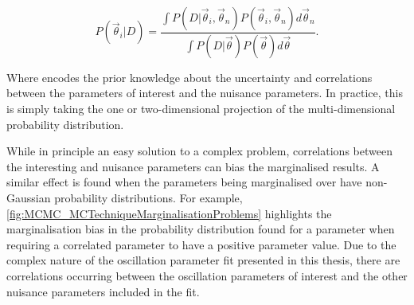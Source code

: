 \begin{equation}
P(\vec{\theta}_{i}|D) = \frac{\int P(D|\vec{\theta}_{i},\vec{\theta}_{n}) P(\vec{\theta}_{i},\vec{\theta}_{n}) d\vec{\theta}_{n}}{\int P(D|\vec{\theta}) P(\vec{\theta}) d\vec{\theta}}.
\end{equation}

Where  encodes the prior knowledge about the uncertainty and correlations between the parameters of interest and the nuisance parameters. In practice, this is simply taking the one or two-dimensional projection of the multi-dimensional probability distribution.

While in principle an easy solution to a complex problem, correlations between the interesting and nuisance parameters can bias the marginalised results. A similar effect is found when the parameters being marginalised over have non-Gaussian probability distributions. For example, \autoref{fig:MCMC_MCTechniqueMarginalisationProblems} highlights the marginalisation bias in the probability distribution found for a parameter when requiring a correlated parameter to have a positive parameter value. Due to the complex nature of the oscillation parameter fit presented in this thesis, there are correlations occurring between the oscillation parameters of interest and the other nuisance parameters included in the fit.

